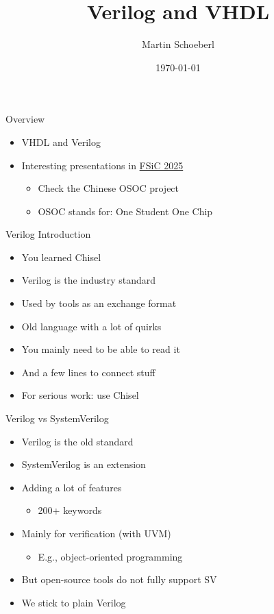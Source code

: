 

\newif\ifbook


\title{Verilog and VHDL}
\author{Martin Schoeberl}
\date{\today}



\begin{frame}
\titlepage
\end{frame}


\begin{frame}[fragile]{Overview}
\begin{itemize}
\item VHDL and Verilog
\item Interesting presentations in \href{https://wiki.f-si.org/FSiC2025}{FSiC 2025}
\begin{itemize}
\item Check the Chinese OSOC project
\item OSOC stands for: One Student One Chip
\end{itemize}
\end{itemize}
\end{frame}


\begin{frame}[fragile]{Verilog Introduction}
\begin{itemize}
\item You learned Chisel
\item Verilog is the industry standard 
\item Used by tools as an exchange format
\item Old language with a lot of quirks
\item You mainly need to be able to read it
\item And a few lines to connect stuff
\item For serious work: use Chisel
\end{itemize}
\end{frame}



\begin{frame}[fragile]{Verilog vs SystemVerilog}
\begin{itemize}
\item Verilog is the old standard
\item SystemVerilog is an extension
\item Adding a lot of features
\begin{itemize}
\item 200+ keywords
\end{itemize}
\item Mainly for verification (with UVM)
\begin{itemize}
\item E.g., object-oriented programming
\end{itemize}
\item But open-source tools do not fully support SV
\item We stick to plain Verilog
\end{itemize}
\end{frame}

